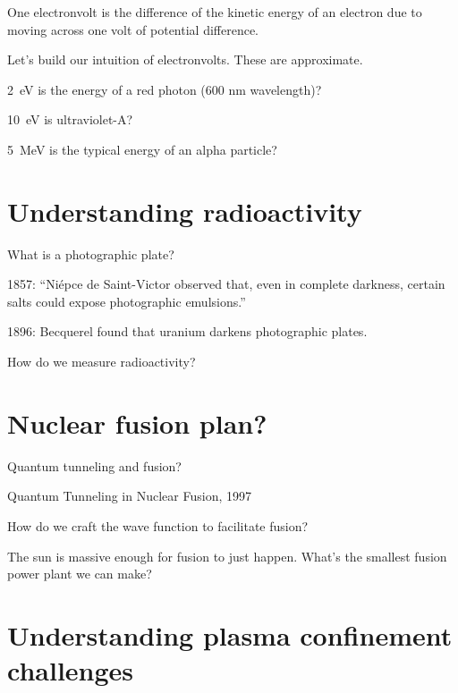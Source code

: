 One electronvolt is the difference of the kinetic energy of an electron
due to moving across one volt of potential difference.

Let's build our intuition of electronvolts.
These are approximate.

\SI{2}{eV} is the energy of a red photon (600 nm wavelength)?

\SI{10}{eV} is ultraviolet-A?

\SI{5}{MeV} is the typical energy of an alpha particle?

\section{Understanding radioactivity}


What is a photographic plate?

1857:
\enquote{Ni\'epce de Saint-Victor observed that,
even in complete darkness,
certain salts could expose photographic emulsions.}

1896:
Becquerel found that uranium darkens photographic plates.



How do we measure radioactivity?

\section{Nuclear fusion plan?}

Quantum tunneling and fusion?

Quantum Tunneling in Nuclear Fusion, 1997

How do we craft the wave function to facilitate fusion?

The sun is massive enough for fusion to just happen.
What's the smallest fusion power plant we can make?

\section{Understanding plasma confinement challenges}

